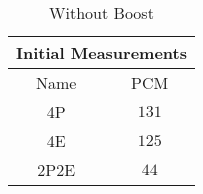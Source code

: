 \begin{table}[H]
    \centering
    \begin{tabular}{|| c | c ||}
    \hline
    \multicolumn{2}{||c||}{Initial Measurements} \\ [0.5ex] \hline\hline
    Name & PCM \\\hline
    4P & $131$ \\
    4E & $125$ \\
    2P2E& $44$ \\\hline
    \end{tabular}
    \caption*{Without Boost}
    \label{tab:initial-measurements-bonus}
\end{table}